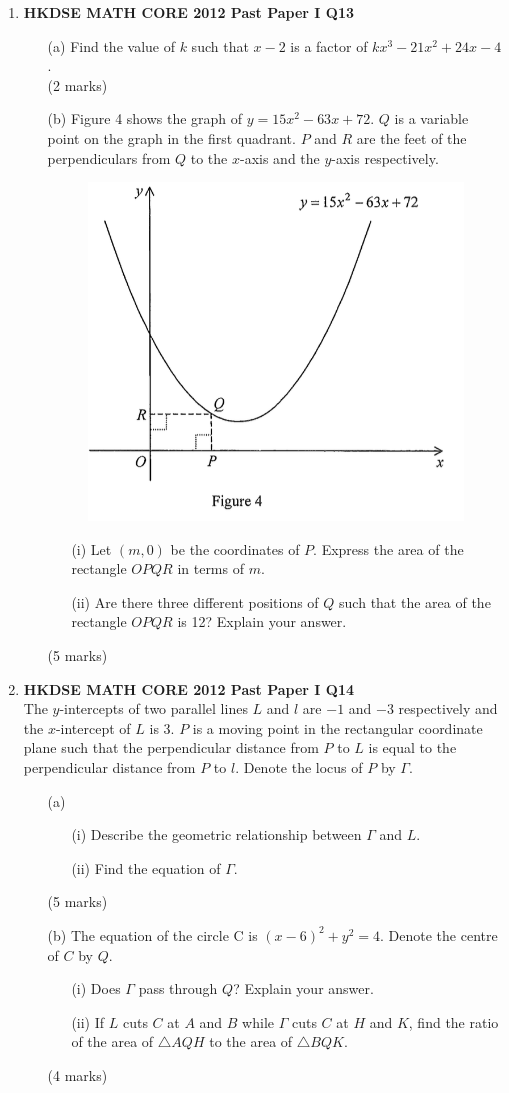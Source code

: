 \documentclass[12pt]{article}
\begin{document}
\begin{enumerate}
	\item \textbf{HKDSE MATH CORE 2012 Past Paper I Q13}
	\begin{enumerate}
		\item[(a)] Find the value of $k$ such that $x - 2$ is a factor of $kx^3 - 21x^2 + 24x - 4$. \\(2 marks)
		\item[(b)] Figure 4 shows the graph of $y = 15x^2 - 63x + 72$. $Q$ is a variable point on the graph in the first quadrant. $P$ and $R$ are the feet of the perpendiculars from $Q$ to the $x$-axis and the $y$-axis respectively.
		\begin{figure}[H]
			\centering
			\includegraphics[width = .3\linewidth]{2012Figure1.4}
		\end{figure}
		\begin{enumerate}
			\item[(i)] Let $(m, 0)$ be the coordinates of $P$. Express the area of the rectangle $OPQR$ in terms of $m$.
			\item[(ii)] Are there three different positions of $Q$ such that the area of the rectangle $OPQR$ is 12? Explain your answer.
		\end{enumerate}
		(5 marks)
	\end{enumerate}

	\item \textbf{HKDSE MATH CORE 2012 Past Paper I Q14}\\
	The $y$-intercepts of two parallel lines $L$ and $l$ are $-1$ and $-3$ respectively and the $x$-intercept of $L$ is 3. $P$ is a moving point in the rectangular coordinate plane such that the perpendicular distance from $P$ to $L$ is equal to the perpendicular distance from $P$ to $l$. Denote the locus of $P$ by $\Gamma$.
	\begin{enumerate}
		\item[(a)]
		\begin{enumerate}
			\item[(i)] Describe the geometric relationship between $\Gamma$ and $L$.
			\item[(ii)] Find the equation of $\Gamma$.
		\end{enumerate}
		(5 marks)
		\item[(b)] The equation of the circle C is $(x-6)^2 + y^2 = 4$. Denote the centre of $C$ by $Q$.
		\begin{enumerate}
			\item[(i)] Does $\Gamma$ pass through $Q$? Explain your answer.
			\item[(ii)] If $L$ cuts $C$ at $A$ and $B$ while $\Gamma$ cuts $C$ at $H$ and $K$, find the ratio of the area of $\triangle AQH$ to the area of $\triangle BQK$.
		\end{enumerate}
		(4 marks)
	\end{enumerate}


\end{enumerate}
\end{document}
